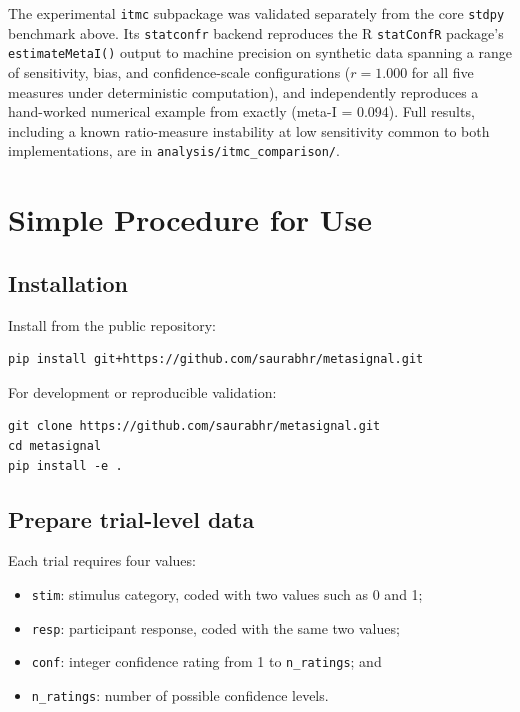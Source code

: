 \documentclass{article}
\providecommand{\tightlist}{\setlength{\itemsep}{0pt}\setlength{\parskip}{0pt}} %
\begin{document}
The experimental \texttt{itmc} subpackage was validated separately from the core \texttt{stdpy} benchmark above. Its \texttt{statconfr} backend reproduces the R \texttt{statConfR} package's \texttt{estimateMetaI()} output to machine precision on synthetic data spanning a range of sensitivity, bias, and confidence-scale configurations ($r = 1.000$ for all five measures under deterministic computation), and independently reproduces a hand-worked numerical example from \citet{dayan2023} exactly (meta-I = 0.094). Full results, including a known ratio-measure instability at low sensitivity common to both implementations, are in \texttt{analysis/itmc\_comparison/}.

\section{Simple Procedure for Use}\label{simple-procedure-for-use}

\subsection{Installation}\label{installation}

Install from the public repository:

\begin{verbatim}
pip install git+https://github.com/saurabhr/metasignal.git
\end{verbatim}

For development or reproducible validation:

\begin{verbatim}
git clone https://github.com/saurabhr/metasignal.git
cd metasignal
pip install -e .
\end{verbatim}

\subsection{Prepare trial-level data}\label{prepare-trial-level-data}

Each trial requires four values:

\begin{itemize}
\tightlist
\item
  \texttt{stim}: stimulus category, coded with two values such as 0 and 1;
\item
  \texttt{resp}: participant response, coded with the same two values;
\item
  \texttt{conf}: integer confidence rating from 1 to \texttt{n\_ratings}; and
\item
  \texttt{n\_ratings}: number of possible confidence levels.
\end{itemize}
\end{document}

